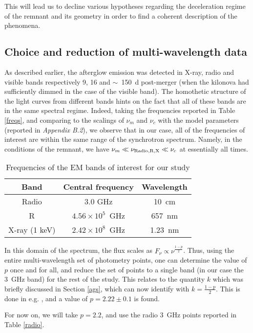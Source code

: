 This will lead us to decline various hypotheses regarding the deceleration regime of the remnant and its geometry in order to find a coherent description of the phenomena.

\subsection{Choice and reduction of multi-wavelength data}
As described earlier, the afterglow emission was detected in X-ray, radio and visible bands respectively 9, 16 and $\sim$~150~d post-merger (when the kilonova had sufficiently dimmed in the case of the visible band). The homothetic structure of the light curves from different bands hints on the fact that all of these bands are in the same spectral regime. Indeed, taking the frequencies reported in Table \ref{freqs}, and comparing to the scalings of $\nu_m$ and $\nu_c$ with the model parameters (reported in \textit{Appendix B.2}), we observe that in our case, all of the frequencies of interest are within the same range of the synchrotron spectrum. Namely, in the conditions of the remnant, we have $\nu_m \ll \nu_{\rm{Radio, R, X}} \ll \nu_c$ at essentially all times.

\begin{table}
\begin{center}
\begin{tabular}{c|c|c}
\bf{Band} & \bf{Central frequency} & \bf{Wavelength}\\
\hline
Radio & 3.0 GHz & 10~cm\\
R & $4.56\times 10^5$~GHz & 657~nm \\
X-ray (1 keV) & $2.42\times 10^8$~GHz & 1.23~nm \\
\end{tabular}
\caption{Frequencies of the EM bands of interest for our study}
\label{freq}
\end{center}
\end{table}

In this domain of the spectrum, the flux scales as $F_\nu \propto \nu^{\frac{1 - p}{2}}$. Thus, using the entire multi-wavelength set of photometry points, one can determine the value of $p$ once and for all, and reduce the set of points to a single band (in our case the 3~GHz band) for the rest of the study. This relates to the quantity $k$ which was briefly discussed in Section \ref{ags}, which can now identify with $k = \frac{1 - p}{2}$. This is done in e.g. \citep{5}, and a value of $p = 2.22\pm0.1$ is found.

For now on, we will take $p = 2.2$, and use the radio 3~GHz points reported in Table \ref{radio}.

